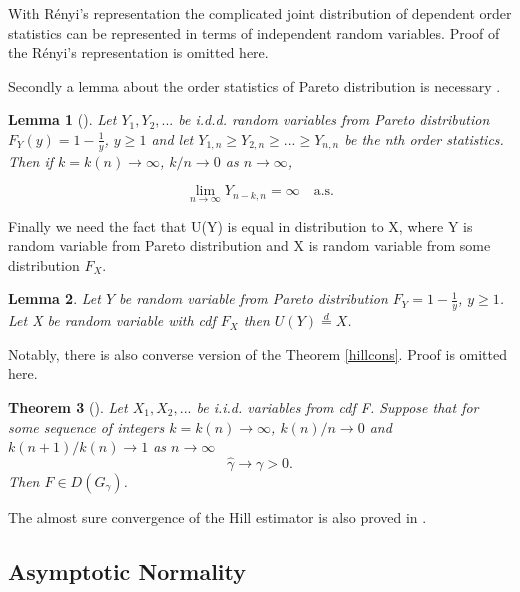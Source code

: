 \documentclass[english,12pt,a4paper,pdftex,sci,utf8]{aaltothesis} %
\newtheorem{theorem}{Theorem}[section]
\newtheorem{lemma}[theorem]{Lemma}
\begin{document}
With R{\'e}nyi's representation the complicated joint distribution of dependent order statistics can be represented in terms of independent random variables. Proof of the R{\'e}nyi's representation is omitted here.

Secondly a lemma about the order statistics of Pareto distribution is necessary \cite{deHaan}.

\begin{lemma}[{\cite[Lemma 3.2.1]{deHaan}}]
Let $Y_1, Y_2, ...$ be i.d.d. random variables from Pareto distribution $F_Y(y)=1-\frac{1}{y}$, $y \geq 1$ and let $Y_{1,n} \geq Y_{2,n} \geq ... \geq Y_{n,n}$ be the nth order statistics. Then if $k=k(n)  \rightarrow \infty$, $k/n \rightarrow 0$ as $n \rightarrow \infty$,

\begin{equation*}
\lim_{n\to\infty} Y_{n-k,n} = \infty  \quad  \text{a.s}.
\end{equation*}
\label{asconv}
\end{lemma}


Finally we need the fact that U(Y) is equal in distribution to X, where Y is random variable from Pareto distribution and X is random variable from some distribution $F_X$.

\begin{lemma}
Let $Y$ be random variable from Pareto distribution $F_Y=1-\frac{1}{y}$, $y \geq 1$. Let X be random variable with cdf $F_X$ then $U(Y) \overset{d}{=} X$.
\label{U}
\end{lemma}




Notably, there is also converse version of the Theorem \ref{hillcons}. Proof is omitted here.

\begin{theorem}[{\cite[Theorem 3.2.4]{deHaan}}]
Let $X_1, X_2,...$ be i.i.d. variables from cdf F. Suppose that for some sequence of integers $k=k(n) \rightarrow \infty$, $k(n)/n \rightarrow 0$ and $k(n+1)/k(n) \rightarrow 1$ as $n \rightarrow \infty$
\begin{equation*}
\hat{\gamma} \rightarrow \gamma > 0.
\end{equation*}
Then $F \in D(G_{\gamma})$.
\end{theorem}

The almost sure convergence of the Hill estimator is also proved in \cite{mason}.

\subsection{Asymptotic Normality}
\end{document}
